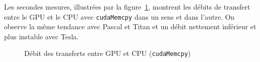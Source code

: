 Les secondes mesures, illustrées par la figure~\ref{fig:cudamemcpy_throughput}, montrent les débits de transfert entre le \acs{GPU} et le \acs{CPU} avec \texttt{cudaMemcpy} dans un sens et dans l'autre. On observe la même tendance avec Pascal et Titan et un débit nettement inférieur et plus instable avec Tesla.

\begin{figure}[h]
	\centering
	\caption{Débit des transferts entre \acs{GPU} et \acs{CPU} (\texttt{cudaMemcpy})}
	\label{fig:cudamemcpy_throughput}
\end{figure}

